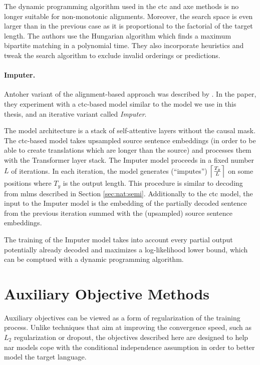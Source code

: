 The dynamic programming algorithm used in the \ac{ctc} and \ac{axe} methods is
no longer suitable for non-monotonic alignments. Moreover, the search space is
even larger than in the previous case as it is proportional to the factorial of
the target length. The authors use the Hungarian algorithm
\citep{kuhn1955hungarian} which finds a maximum bipartite matching in a
polynomial time. They also incorporate heuristics and tweak the search
algorithm to exclude invalid orderings or predictions.

\paragraph{Imputer.} Antoher variant of the alignment-based approach was
described by \citet{saharia-etal-2020-non}. In the paper, they experiment with
a \acs{ctc}-based model similar to the model we use in this thesis, and an
iterative variant called \emph{Imputer}.

The model architecture is a stack of self-attentive layers without the causal
mask. The \acs{ctc}-based model takes upsampled source sentence embeddings (in
order to be able to create translations which are longer than the source) and
processes them with the Transformer layer stack.  The Imputer model proceeds in
a fixed number $L$ of iterations. In each iteration, the model generates
(``imputes'') $\ceil*{\frac{T_y}{L}}$ on some positions where $T_y$ is the
output length. This procedure is similar to decoding from \aclp{mlm} described
in Section \ref{sec:nat:semi}. Additionally to the \ac{ctc} model, the input to
the Imputer model is the embedding of the partially decoded sentence from the
previous iteration summed with the (upsampled) source sentence embeddings.

The training of the Imputer model takes into account every partial output
potentially already decoded and maximizes a log-likelihood lower bound, which
can be comptued with a dynamic programming algorithm. 


\section{Auxiliary Objective Methods}%
\label{sec:nat:aux}

Auxiliary objectives can be viewed as a form of regularization of the training
process. Unlike techniques that aim at improving the convergence speed, such as
$L_2$ regularization or dropout, the objectives described here are designed to
help \acl{nar} models cope with the conditional independence assumption in
order to better model the target language.

